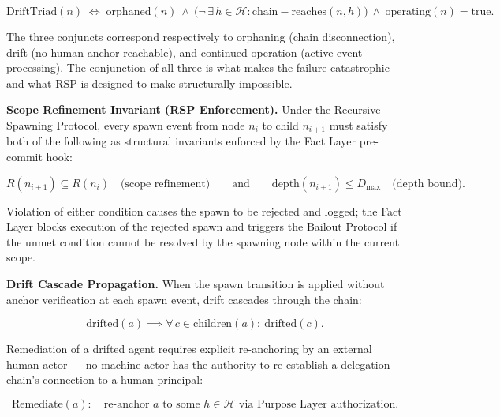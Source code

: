 \begin{equation}
\mathrm{DriftTriad}(n) \;\iff\; \mathrm{orphaned}(n)\ \land\ \bigl( \neg\,\exists\, h \in \mathcal{H} : \mathrm{chain-reaches}(n, h) \bigr)\ \land\ \mathrm{operating}(n) = \mathrm{true}.
\label{eq:rs-drift-condition}
\end{equation}

The three conjuncts correspond respectively to orphaning (chain disconnection), drift (no human anchor reachable), and continued operation (active event processing). The conjunction of all three is what makes the failure catastrophic and what RSP is designed to make structurally impossible.

\medskip
\noindent\textbf{Scope Refinement Invariant (RSP Enforcement).}
Under the Recursive Spawning Protocol, every spawn event from node $n_i$ to child $n_{i+1}$ must satisfy both of the following as structural invariants enforced by the Fact Layer pre-commit hook:

\begin{equation}
R(n_{i+1}) \subseteq R(n_i) \quad \text{(scope refinement)} \qquad \text{and} \qquad \mathrm{depth}(n_{i+1}) \leq D_{\max} \quad \text{(depth bound)}.
\label{eq:rs-scope-refinement}
\end{equation}

Violation of either condition causes the spawn to be rejected and logged; the Fact Layer blocks execution of the rejected spawn and triggers the Bailout Protocol if the unmet condition cannot be resolved by the spawning node within the current scope.

\medskip
\noindent\textbf{Drift Cascade Propagation.}
When the spawn transition is applied without anchor verification at each spawn event, drift cascades through the chain:

\begin{equation}
\mathrm{drifted}(a) \implies \forall\, c \in \mathrm{children}(a):\ \mathrm{drifted}(c).
\label{eq:rs-drift-propagation}
\end{equation}

Remediation of a drifted agent requires explicit re-anchoring by an external human actor — no machine actor has the authority to re-establish a delegation chain's connection to a human principal:

\begin{equation}
\mathrm{Remediate}(a):\quad \text{re-anchor } a \text{ to some } h \in \mathcal{H} \text{ via Purpose Layer authorization.}
\label{eq:rs-drift-remediation}
\end{equation}

